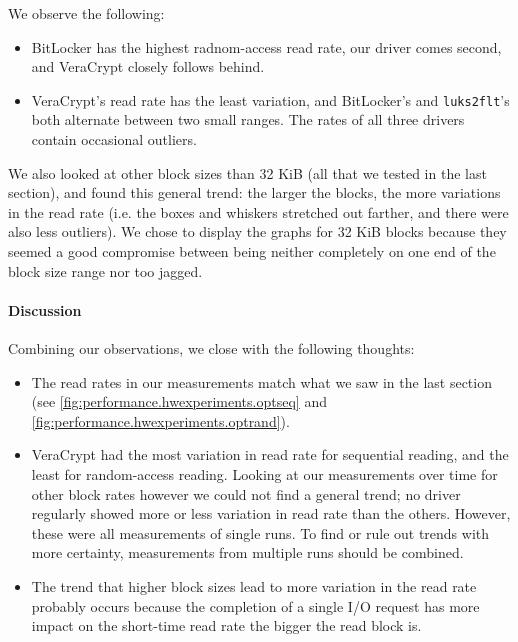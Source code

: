 We observe the following:
\begin{itemize}[beginpenalty=10000]
	\item BitLocker has the highest radnom-access read rate, our driver comes second, and VeraCrypt closely follows behind.
	\item VeraCrypt's read rate has the least variation, and BitLocker's and \texttt{luks2flt}'s both alternate between two small ranges. The rates of all three drivers contain occasional outliers.
\end{itemize}

We also looked at other block sizes than 32 KiB (all that we tested in the last section), and found this general trend: the larger the blocks, the more variations in the read rate (i.e. the boxes and whiskers stretched out farther, and there were also less outliers). We chose to display the graphs for 32 KiB blocks because they seemed a good compromise between being neither completely on one end of the block size range nor too jagged.

\paragraph{Discussion}
Combining our observations, we close with the following thoughts:
\begin{itemize}[beginpenalty=10000]
	\item The read rates in our measurements match what we saw in the last section (see \autoref{fig:performance.hwexperiments.optseq} and \autoref{fig:performance.hwexperiments.optrand}).
	\item VeraCrypt had the most variation in read rate for sequential reading, and the least for random-access reading. Looking at our measurements over time for other block rates however we could not find a general trend; no driver regularly showed more or less variation in read rate than the others. However, these were all measurements of single runs. To find or rule out trends with more certainty, measurements from multiple runs should be combined.
	\item The trend that higher block sizes lead to more variation in the read rate probably occurs because the completion of a single I/O request has more impact on the short-time read rate the bigger the read block is.
\end{itemize}
